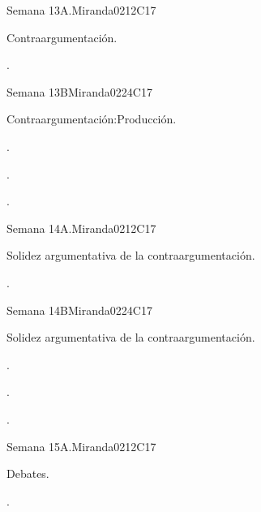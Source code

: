 \begin{syllabus}
\begin{unit}{Semana 13A.}{}{Miranda02}{12}{C17}
   \begin{topics}
      \item Contraargumentación.
   \end{topics}
   \begin{learningoutcomes}
      \item . 
   \end{learningoutcomes}
\end{unit}

\begin{unit}{Semana 13B}{}{Miranda02}{24}{C17}
   \begin{topics}
      \item Contraargumentación:Producción.
   \end{topics}

   \begin{learningoutcomes}
      \item . 
      \item .
      \item . 
      \end{learningoutcomes}
\end{unit}

\begin{unit}{Semana 14A.}{}{Miranda02}{12}{C17}
   \begin{topics}
      \item Solidez argumentativa de la contraargumentación. 
   \end{topics}
   \begin{learningoutcomes}
      \item . 
   \end{learningoutcomes}
\end{unit}

\begin{unit}{Semana 14B}{}{Miranda02}{24}{C17}
   \begin{topics}
      \item Solidez argumentativa de la contraargumentación.
   \end{topics}

   \begin{learningoutcomes}
      \item . 
      \item .
      \item . 
      \end{learningoutcomes}
\end{unit}

\begin{unit}{Semana 15A.}{}{Miranda02}{12}{C17}
   \begin{topics}
      \item Debates.
   \end{topics}
   \begin{learningoutcomes}
      \item . 
   \end{learningoutcomes}
\end{unit}


\end{syllabus}
